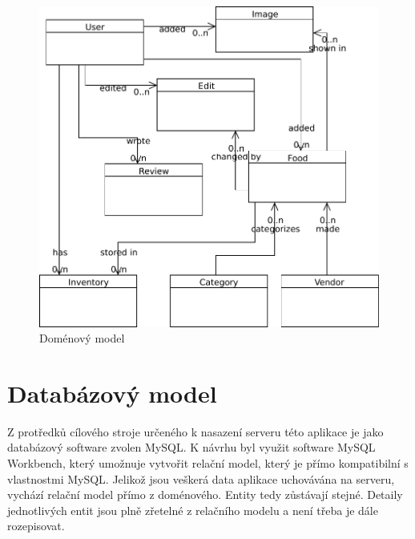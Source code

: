 \documentclass[thesis=B,czech]{FITthesis}[2013/10/20]
\begin{document}
\begin{figure}[H]
  \centering
  \includegraphics[scale=0.75]{diagrams/model}
  \caption{Doménový model}
  \label{fig:DomainModel}
\end{figure}

\section{Databázový model}

Z protředků cílového stroje určeného k nasazení serveru této aplikace je jako databázový software zvolen MySQL. K návrhu byl využit software MySQL Workbench, který umožnuje vytvořit relační model, který je přímo kompatibilní s vlastnostmi MySQL. Jelikož jsou veškerá data aplikace uchovávána na serveru, vychází relační model přímo z doménového. Entity tedy zůstávají stejné. Detaily jednotlivých entit jsou plně zřetelné z relačního modelu a není třeba je dále rozepisovat.
\end{document}
